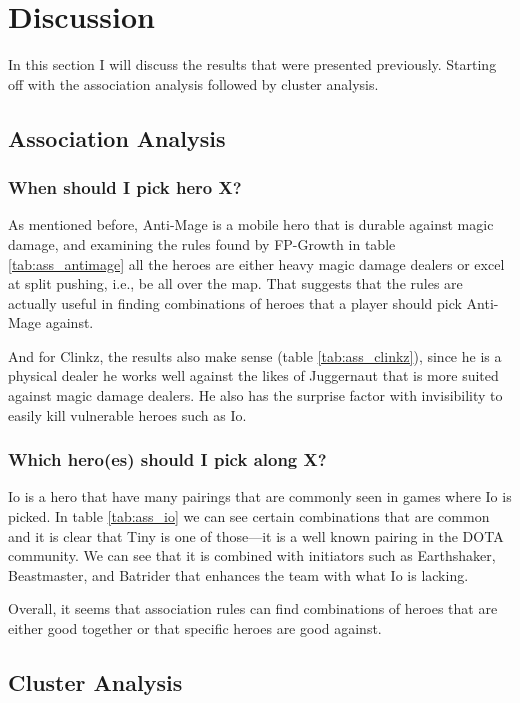 \documentclass[result.tex]{subfiles}
\begin{document}
\section*{\centering Discussion}

In this section I will discuss the results that were presented previously. Starting off with the association analysis followed by cluster analysis.

\subsection*{Association Analysis}

\subsubsection*{When should I pick hero X?}

As mentioned before, Anti-Mage is a mobile hero that is durable against magic damage, and examining the rules found by FP-Growth in table \ref{tab:ass_antimage} all the heroes are either heavy magic damage dealers or excel at split pushing, i.e., be all over the map. That suggests that the rules are actually useful in finding combinations of heroes that a player should pick Anti-Mage against.

And for Clinkz, the results also make sense (table \ref{tab:ass_clinkz}), since he is a physical dealer he works well against the likes of Juggernaut that is more suited against magic damage dealers. He also has the surprise factor with invisibility to easily kill vulnerable heroes such as Io.

\subsubsection*{Which hero(es) should I pick along X?}

Io is a hero that have many pairings that are commonly seen in games where Io is picked. In table \ref{tab:ass_io} we can see certain combinations that are common and it is clear that Tiny is one of those---it is a well known pairing in the DOTA community. We can see that it is combined with initiators such as Earthshaker, Beastmaster, and Batrider that enhances the team with what Io is lacking.

Overall, it seems that association rules can find combinations of heroes that are either good together or that specific heroes are good against.

\subsection*{Cluster Analysis}
\end{document}
